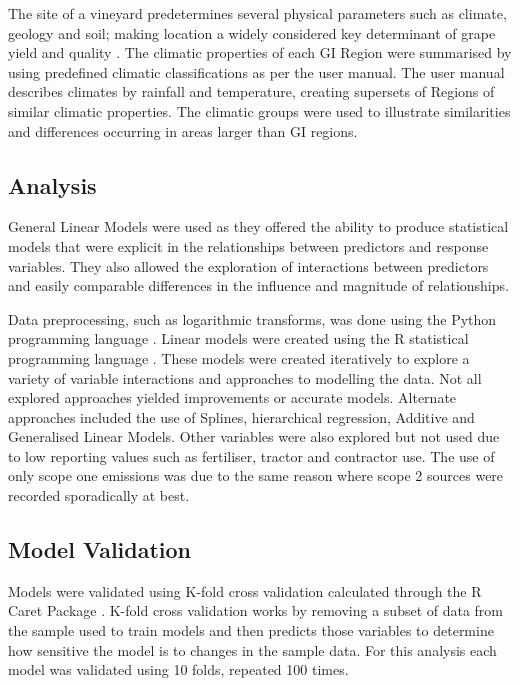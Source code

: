 \documentclass[review,12pt,authoryear]{elsarticle}
\begin{document}
\begin{linenumbers}
The site of a vineyard predetermines several physical parameters such as climate, geology and soil; making location a widely considered key determinant of grape yield and quality \citep{abbalDecisionSupportSystem2016,agostaRegionalClimateVariability2012,fragaMultivariateClusteringViticultural2017}. The climatic properties of each GI Region were summarised by using predefined climatic classifications as per the \citet{swaSustainableWinegrowingAustralia2021} user manual. The user manual describes climates by rainfall and temperature, creating supersets of Regions of similar climatic properties. The climatic groups were used to illustrate similarities and differences occurring in areas larger than GI regions.

\subsection{Analysis}
General Linear Models were used as they offered the ability to produce statistical models that were explicit in the relationships between predictors and response variables. They also allowed the exploration of interactions between predictors and easily comparable differences in the influence and magnitude of relationships.

Data preprocessing, such as logarithmic transforms, was done using the Python programming language \citep{g.vanrossumPythonTutorialTechnical1995}. Linear models were created using the R statistical programming language \citep{rcoreteamLanguageEnvironmentStatistical2021}. These models were created iteratively to explore a variety of variable interactions and approaches to modelling the data. Not all explored approaches yielded improvements or accurate models. Alternate approaches included the use of Splines, hierarchical regression, Additive and Generalised Linear Models. Other variables were also explored but not used due to low reporting values such as fertiliser, tractor and contractor use. The use of only scope one emissions was due to the same reason where scope 2 sources were recorded sporadically at best.

\subsection{Model Validation}
Models were validated using K-fold cross validation calculated through the R Caret Package \citep{kuhnBuildingPredictiveModels2008}. K-fold cross validation works by removing a subset of data from the sample used to train models and then predicts those variables to determine how sensitive the model is to changes in the sample data. For this analysis each model was validated using 10 folds, repeated 100 times. %


\end{linenumbers}
\end{document}
